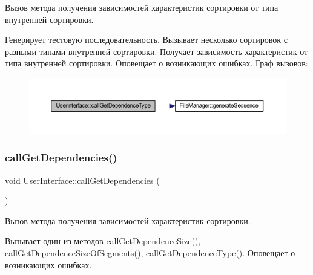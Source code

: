Вызов метода получения зависимостей характеристик сортировки от типа внутренней сортировки. 

Генерирует тестовую последовательность. Вызывает несколько сортировок с разными типами внутренней сортировки. Получает зависимость характеристик от типа внутренней сортировки. Оповещает о возникающих ошибках. Граф вызовов\+:\nopagebreak
\begin{figure}[H]
\begin{center}
\leavevmode
\includegraphics[width=350pt]{class_user_interface_aa413c00a65ae4faf9421e9fc359663ec_cgraph}
\end{center}
\end{figure}
\hypertarget{class_user_interface_a332db63dca89d684f7e9e1272f4c3745}{}\label{class_user_interface_a332db63dca89d684f7e9e1272f4c3745} 
\subsubsection{\texorpdfstring{call\+Get\+Dependencies()}{callGetDependencies()}}
{\footnotesize\ttfamily void User\+Interface\+::call\+Get\+Dependencies (\begin{DoxyParamCaption}{ }\end{DoxyParamCaption})\hspace{0.3cm}{\ttfamily [private]}}



Вызов метода получения зависимостей характеристик сортировки. 

Вызывает один из методов \hyperlink{class_user_interface_a1dc307f92c919866f13ddaf30cde1a70}{call\+Get\+Dependence\+Size()}, \hyperlink{class_user_interface_ab668f3b2d9f89ce3eacda5e166f33807}{call\+Get\+Dependence\+Size\+Of\+Segments()}, \hyperlink{class_user_interface_aa413c00a65ae4faf9421e9fc359663ec}{call\+Get\+Dependence\+Type()}. Оповещает о возникающих ошибках. \hypertarget{class_user_interface_ad388ff348c0a124038f4ea9756b80041}{}\label{class_user_interface_ad388ff348c0a124038f4ea9756b80041} 

